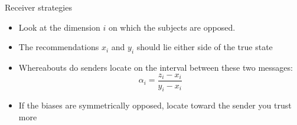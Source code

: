 \documentclass{beamer}
\newcommand{\showOn}[3]{\only<#2>{\color<#2>{black} #1}\only<#3>{\color<#3>{white} #1}}
\begin{document}






\begin{frame}{Receiver strategies}
	\begin{itemize}
		\item Look at the dimension $i$ on which the subjects are opposed.
		\item The recommendations $x_i$ and $y_i$ should lie either side of the true state\pause
		\item Whereabouts do senders locate on the interval between these two messages:
		$$\alpha_i=\frac{z_i-x_i}{y_i-x_i} $$\pause
		\item If the biases are symmetrically opposed, locate toward the sender you trust more
	\end{itemize}
\end{frame}
\end{document}
